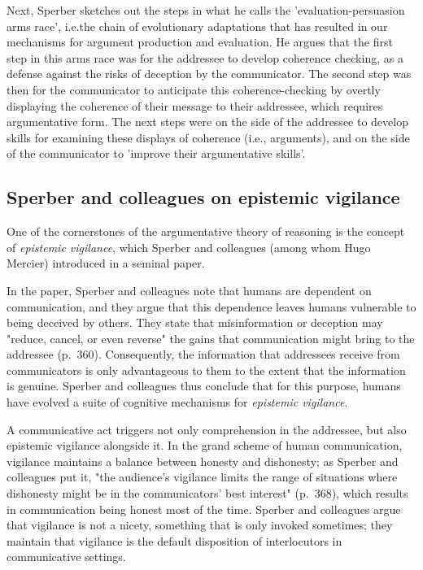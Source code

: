 
Next, Sperber sketches out the steps in what he calls the 'evaluation-persuasion arms race', i.e.\@ the chain of evolutionary adaptations that has resulted in our mechanisms for argument production and evaluation.
He argues that the first step in this arms race was for the addressee to develop coherence checking, as a defense against the risks of deception by the communicator. The second step was then for the communicator to anticipate this coherence-checking by overtly displaying the coherence of their message to their addressee, which requires argumentative form. The next steps were on the side of the addressee to develop skills for examining these displays of coherence (i.e., arguments), and on the side of the communicator to 'improve their argumentative skills'.


\subsection{Sperber and colleagues on epistemic vigilance}
\label{sec:Sperber10}


One of the cornerstones of the argumentative theory of reasoning is the concept of \emph{epistemic vigilance}, which Sperber and colleagues (among whom Hugo Mercier) introduced in a seminal \citeyear{Sperber10} paper.

In the paper, Sperber and colleagues note that humans are dependent on communication, and they argue that this dependence leaves humans vulnerable to being deceived by others.
They state that misinformation or deception may "reduce, cancel, or even reverse" the gains that communication might bring to the addressee (p.~360).
Consequently, the information that addressees receive from communicators is only advantageous to them to the extent that the information is genuine.
Sperber and colleagues thus conclude that for this purpose, humans have evolved a suite of cognitive mechanisms for \emph{epistemic vigilance}.

A communicative act triggers not only comprehension in the addressee, but also epistemic vigilance alongside it.
In the grand scheme of human communication, vigilance maintains a balance between honesty and dishonesty; as Sperber and colleagues put it, "the audience's vigilance limits the range of situations where dishonesty might be in the communicators' best interest" (p.~368), which results in communication being honest most of the time.
Sperber and colleagues argue that vigilance is not a nicety, something that is only invoked sometimes; they maintain that vigilance is the default disposition of interlocutors in communicative settings.

